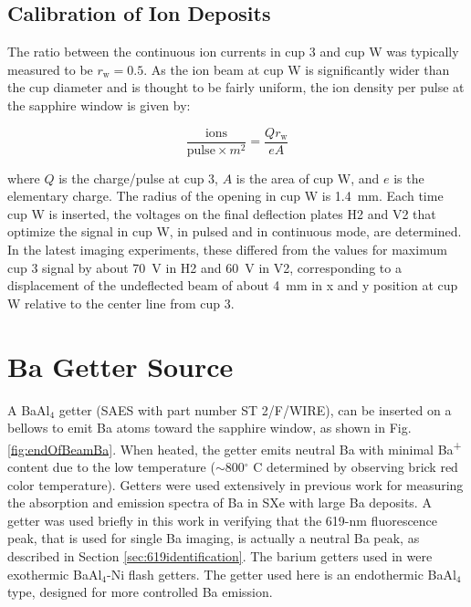 \subsection{Calibration of Ion Deposits}
\label{subsec:ionDepCal}

The ratio between the continuous ion currents in cup 3 and cup W was typically measured to be $r_{\text{w}} = 0.5$.  As the ion beam at cup W is significantly wider than the cup diameter and is thought to be fairly uniform, the ion density per pulse at the sapphire window is given by:

\begin{equation}
\frac{\text{ions}}{\text{pulse} \times m^{2}} = \frac{Q r_{\text{w}}}{e A}
\label{eqn:ion_density}
\end{equation}

\noindent
where $Q$ is the charge/pulse at cup 3, $A$ is the area of cup W, and $e$ is the elementary charge.  The radius of the opening in cup W is 1.4~mm.  Each time cup W is inserted, the voltages on the final deflection plates H2 and V2 that optimize the signal in cup W, in pulsed and in continuous mode, are determined.  In the latest imaging experiments, these differed from the values for maximum cup 3 signal by about 70~V in H2 and 60~V in V2, corresponding to a displacement of the undeflected beam of about 4~mm in x and y position at cup W relative to the center line from cup 3.

\section{Ba Getter Source}
\label{sec:getter}

A BaAl$_{4}$ getter (SAES with part number ST 2/F/WIRE), can be inserted on a bellows to emit Ba atoms toward the sapphire window, as shown in Fig. \ref{fig:endOfBeamBa}.  When heated, the getter emits neutral Ba with minimal Ba\textsuperscript{+} content due to the low temperature ($\sim$800$^{\circ}$ C determined by observing brick red color temperature).  Getters were used extensively in previous work \cite{Brian} for measuring the absorption and emission spectra of Ba in SXe with large Ba deposits.  A getter was used briefly in this work in verifying that the 619-nm fluorescence peak, that is used for single Ba imaging, is actually a neutral Ba peak, as described in Section \ref{sec:619identification}.  The barium getters used in \cite{Brian} were exothermic BaAl$_{4}$-Ni flash getters.  The getter used here is an endothermic BaAl$_{4}$ type, designed for more controlled Ba emission.  


